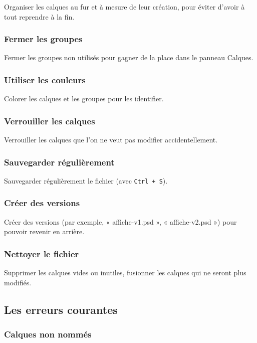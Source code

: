 Organiser les calques au fur et à mesure de leur création, pour éviter d'avoir à tout reprendre à la fin.

\subsubsection{Fermer les groupes}

Fermer les groupes non utilisés pour gagner de la place dans le panneau Calques.

\subsubsection{Utiliser les couleurs}

Colorer les calques et les groupes pour les identifier.

\subsubsection{Verrouiller les calques}

Verrouiller les calques que l'on ne veut pas modifier accidentellement.

\subsubsection{Sauvegarder régulièrement}

Sauvegarder régulièrement le fichier (avec \texttt{Ctrl + S}).

\subsubsection{Créer des versions}

Créer des versions (par exemple, « affiche-v1.psd », « affiche-v2.psd ») pour pouvoir revenir en arrière.

\subsubsection{Nettoyer le fichier}

Supprimer les calques vides ou inutiles, fusionner les calques qui ne seront plus modifiés.

\subsection{Les erreurs courantes}

\subsubsection{Calques non nommés}


